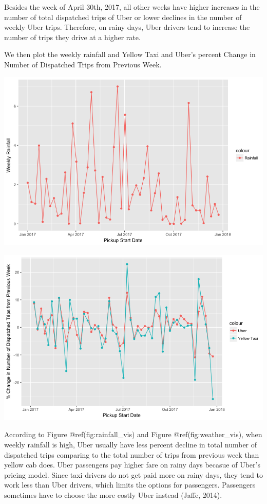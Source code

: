 \documentclass[12pt,twoside]{reedthesis}
\theoremstyle{definition}
\theoremstyle{definition}
\theoremstyle{definition}
\theoremstyle{remark}
\begin{document}
Besides the week of April 30th, 2017, all other weeks have higher
increases in the number of total dispatched trips of Uber or lower
declines in the number of weekly Uber trips. Therefore, on rainy days,
Uber drivers tend to increase the number of trips they drive at a higher
rate.

We then plot the weekly rainfall and Yellow Taxi and Uber's percent
Change in Number of Dispatched Trips from Previous Week.
\begin{center}\includegraphics[width=6.37in]{figure/rainfall_vis} \end{center}
\begin{center}\includegraphics[width=6.51in]{figure/weather_vis} \end{center}

According to Figure @ref(fig:rainfall\_vis) and Figure
@ref(fig:weather\_vis), when weekly rainfall is high, Uber usually have
less percent decline in total number of dispatched trips comparing to
the total number of trips from previous week than yellow cab does. Uber
passengers pay higher fare on rainy days becasue of Uber's pricing
model. Since taxi drivers do not get paid more on rainy days, they tend
to work less than Uber drivers, which limits the options for passengers.
Passengers sometimes have to choose the more costly Uber instead (Jaffe,
2014).
\end{document}
